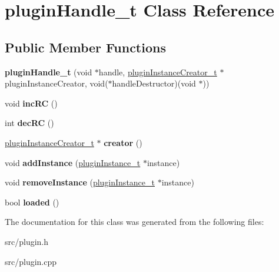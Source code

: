 \hypertarget{classpluginHandle__t}{\section{plugin\-Handle\-\_\-t \-Class \-Reference}
\label{classpluginHandle__t}
}
\subsection*{\-Public \-Member \-Functions}
\begin{DoxyCompactItemize}
\item 
\hypertarget{classpluginHandle__t_abb3fd3fc5b278be5de6b39d8bad7b581}{{\bfseries plugin\-Handle\-\_\-t} (void $\ast$handle, \hyperlink{classpluginInstanceCreator__t}{plugin\-Instance\-Creator\-\_\-t} $\ast$plugin\-Instance\-Creator, void($\ast$handle\-Destructor)(void $\ast$))}\label{classpluginHandle__t_abb3fd3fc5b278be5de6b39d8bad7b581}

\item 
\hypertarget{classpluginHandle__t_a4113d33e3f90f972bd21aa76a237cd18}{void {\bfseries inc\-R\-C} ()}\label{classpluginHandle__t_a4113d33e3f90f972bd21aa76a237cd18}

\item 
\hypertarget{classpluginHandle__t_a98e4746c825940a35068daea99232f63}{int {\bfseries dec\-R\-C} ()}\label{classpluginHandle__t_a98e4746c825940a35068daea99232f63}

\item 
\hypertarget{classpluginHandle__t_a509b31308f4f661f8cd1f0a1e7725579}{\hyperlink{classpluginInstanceCreator__t}{plugin\-Instance\-Creator\-\_\-t} $\ast$ {\bfseries creator} ()}\label{classpluginHandle__t_a509b31308f4f661f8cd1f0a1e7725579}

\item 
\hypertarget{classpluginHandle__t_a82a915f8d5e6fde7b1413025acdc641a}{void {\bfseries add\-Instance} (\hyperlink{classpluginInstance__t}{plugin\-Instance\-\_\-t} $\ast$instance)}\label{classpluginHandle__t_a82a915f8d5e6fde7b1413025acdc641a}

\item 
\hypertarget{classpluginHandle__t_ac099cb18745459fd3bdb008aab790a21}{void {\bfseries remove\-Instance} (\hyperlink{classpluginInstance__t}{plugin\-Instance\-\_\-t} $\ast$instance)}\label{classpluginHandle__t_ac099cb18745459fd3bdb008aab790a21}

\item 
\hypertarget{classpluginHandle__t_ae284e52f2cfe56208b1d48449bba2ead}{bool {\bfseries loaded} ()}\label{classpluginHandle__t_ae284e52f2cfe56208b1d48449bba2ead}

\end{DoxyCompactItemize}


\-The documentation for this class was generated from the following files\-:\begin{DoxyCompactItemize}
\item 
src/plugin.\-h\item 
src/plugin.\-cpp\end{DoxyCompactItemize}
